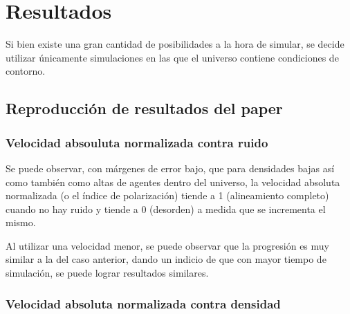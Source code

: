 \documentclass[a4paper]{article}
\begin{document}
    \section{Resultados}

        Si bien existe una gran cantidad de posibilidades a la hora de simular, se decide utilizar únicamente simulaciones en las que el universo contiene condiciones de contorno.

        \subsection{Reproducción de resultados del paper}
            \subsubsection{Velocidad absouluta normalizada contra ruido}


                Se puede observar, con márgenes de error bajo, que para densidades bajas así como también como altas de agentes dentro del universo, la velocidad absoluta normalizada (o el índice de polarización) tiende a 1 (alineamiento completo) cuando no hay ruido y tiende a 0 (desorden) a medida que se incrementa el mismo.


                Al utilizar una velocidad menor, se puede observar que la progresión es muy similar a la del caso anterior, dando un indicio de que con mayor tiempo de simulación, se puede lograr resultados similares.

            \subsubsection{Velocidad absoluta normalizada contra densidad}
\end{document}
